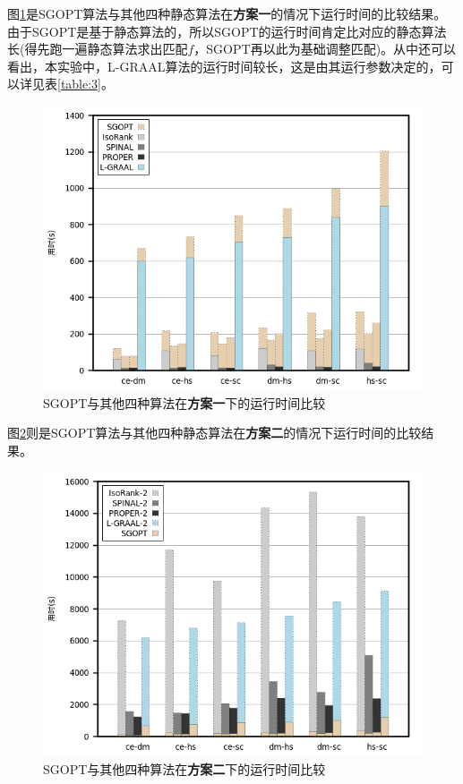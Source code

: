 图\ref{fig:allt}是SGOPT算法与其他四种静态算法在\textbf{方案一}的情况下运行时间的比较结果。由于SGOPT是基于静态算法的，所以SGOPT的运行时间肯定比对应的静态算法长(得先跑一遍静态算法求出匹配$f$，SGOPT再以此为基础调整匹配)。从中还可以看出，本实验中，L-GRAAL算法的运行时间较长，这是由其运行参数决定的，可以详见表\ref{table:3}。
\begin{figure}[htbp]
\centering
\includegraphics[height=0.25\textheight]{pic/allt.png}
\caption{SGOPT与其他四种算法在\textbf{方案一}下的运行时间比较} 
\label{fig:allt}
\end{figure}

图\ref{fig:allt2}则是SGOPT算法与其他四种静态算法在\textbf{方案二}的情况下运行时间的比较结果。
\begin{figure}[htbp]
\centering
\includegraphics[height=0.25\textheight]{pic/allt2.png}
\caption{SGOPT与其他四种算法在\textbf{方案二}下的运行时间比较} 
\label{fig:allt2}
\end{figure}

